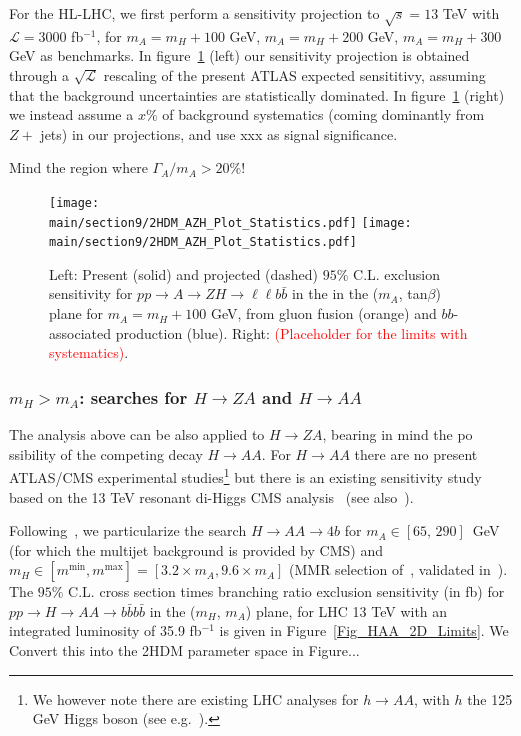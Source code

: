 \documentclass[../report.tex]{subfiles}
\providecommand{\main}{..}
\begin{document}
For the HL-LHC, we first perform a sensitivity projection to $\sqrt{s} = 13$ TeV with $\mathcal{L} = 3000$ fb$^{-1}$, for $m_A = m_H + 100$ GeV, $m_A = m_H + 200$ GeV, $m_A = m_H + 300$ GeV as benchmarks. 
In figure~\ref{AZH_HL-LHC} (left) our sensitivity projection is obtained through a $\sqrt{\mathcal{L}}$ rescaling of the present ATLAS expected 
sensititivy, assuming that the background uncertainties are statistically dominated. In figure~\ref{AZH_HL-LHC} (right) we instead assume a $x\%$ of background systematics (coming dominantly from $Z +$ jets) in our projections, and use xxx as signal significance.

Mind the region where $\Gamma_A/m_A > 20\%$!

\begin{figure}[h]
\begin{center}
\texttt{[image: \\main/section9/2HDM\_AZH\_Plot\_Statistics.pdf]}
\texttt{[image: \\main/section9/2HDM\_AZH\_Plot\_Statistics.pdf]}
\caption{\small Left: Present (solid) and projected (dashed)  $95\%$ C.L. exclusion sensitivity for $p p \to A \to Z H \to \ell\ell b \bar{b}$ in the 
in the ($m_{A}$, tan$\beta$) plane for $m_A = m_H +100$ GeV, from 
gluon fusion (orange) and $bb$-associated production (blue). Right: \textcolor{red}{(Placeholder for the limits with systematics)}.}
\label{AZH_HL-LHC}
\end{center}
\end{figure}


\subsubsection{$m_H > m_A$: searches for $H \to Z A$ and $H \to A A$}

The analysis above can be also applied to $H \to Z A$, bearing in mind the po
ssibility of the competing decay $H \to A A$. For $H \to A A$ there are no present ATLAS/CMS experimental studies\footnote{We however note there are existing LHC analyses for $h \to A A$, with $h$ the 125 GeV Higgs boson (see e.g.~\cite{Khachatryan:2017mnf}).} but there is an existing sensitivity study~\cite{Brooijmans:2018xbu} based on the 13 TeV 
resonant di-Higgs CMS analysis~\cite{CMS:2017xxp} (see also~\cite{CMS:2016tlj}).

Following~\cite{Brooijmans:2018xbu}, we particularize the search $H\to A A \to 4 b$ for $m_{A} \in [65,\, 290]$~GeV (for which the multijet background is provided by CMS) and $m_{H} \in [m^{\mathrm{min}}, m^{\mathrm{max}}] = [3.2\times m_{A}, 9.6\times m_{A}]$ (MMR selection of~\cite{CMS:2017xxp}, validated in~\cite{Brooijmans:2018xbu}). The $95\%$ C.L. cross section times branching ratio exclusion sensitivity (in fb) for $p p \to H \to A A \to b \bar{b} b \bar{b}$ in the ($m_{H}$, $m_{A}$) plane, for LHC 13 TeV with an integrated luminosity of 35.9 fb$^{-1}$ is given in 
Figure~\ref{Fig_HAA_2D_Limits}. We Convert this into the 2HDM parameter space in Figure... 
\end{document}
